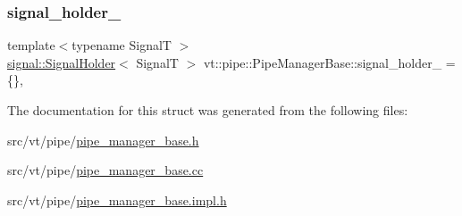 \mbox{\label{structvt_1_1pipe_1_1_pipe_manager_base_a0c85d01e4f6a9bd90056a8745b255c6d}} 
\subsubsection{\texorpdfstring{signal\+\_\+holder\+\_\+}{signal\_holder\_}}
{\footnotesize\ttfamily template$<$typename SignalT $>$ \\
\hyperlink{structvt_1_1pipe_1_1signal_1_1_signal_holder}{signal\+::\+Signal\+Holder}$<$ SignalT $>$ vt\+::pipe\+::\+Pipe\+Manager\+Base\+::signal\+\_\+holder\+\_\+ = \{\}\hspace{0.3cm}{\ttfamily [static]}, {\ttfamily [private]}}



The documentation for this struct was generated from the following files\+:\begin{DoxyCompactItemize}
\item 
src/vt/pipe/\hyperlink{pipe__manager__base_8h}{pipe\+\_\+manager\+\_\+base.\+h}\item 
src/vt/pipe/\hyperlink{pipe__manager__base_8cc}{pipe\+\_\+manager\+\_\+base.\+cc}\item 
src/vt/pipe/\hyperlink{pipe__manager__base_8impl_8h}{pipe\+\_\+manager\+\_\+base.\+impl.\+h}\end{DoxyCompactItemize}
